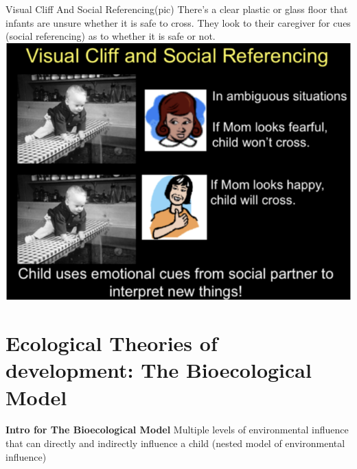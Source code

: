\documentclass[11pt]{beamer}
\begin{document}
\begin{frame}{Visual Cliff And Social Referencing(pic)}
There’s a clear plastic or glass floor that infants are unsure whether it is safe to cross. They look to their caregiver for cues (social referencing) as to whether it is safe or not.\leavevmode\newline
\includegraphics[width=\textwidth]{test/picForVisual.png}
\end{frame}
\section{{\bf{\LARGE{\color{blue}Ecological Theories of development: The Bioecological Model}}}}
\begin{frame}{{\bf{\LARGE{\color{cyan}Intro for The Bioecological Model}}}}
Multiple levels of environmental influence that can directly and indirectly influence a child (nested model of environmental influence)\leavevmode\newline
\end{frame}
\end{document}

